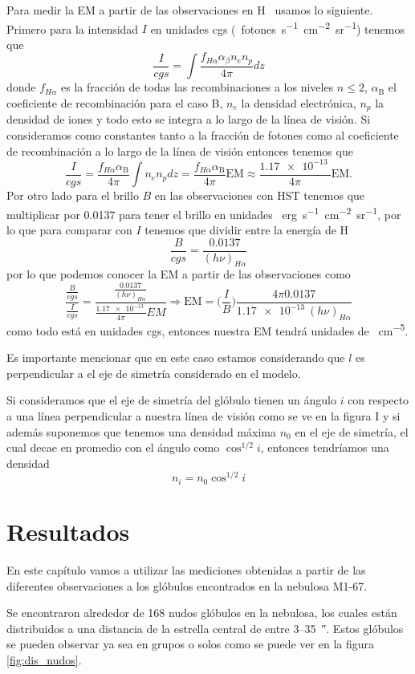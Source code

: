 \documentclass{book}
\begin{document}
Para medir la EM a partir de las observaciones en \unit{H\alpha} usamos lo siguiente. Primero para la intensidad $I$ en unidades cgs (\SI{}{fotones.s^{-1}.cm^{-2}.sr^{-1}}) tenemos que
\[\frac{I}{cgs}=\int \frac{f_{H\alpha}\alpha_\beta n_e n_p}{4\pi}dz\] donde $f_{H\alpha}$ es la fracción de todas las recombinaciones a los niveles $n\le 2$, $\alpha_\mathrm{B}$ el coeficiente de recombinación para el caso B, $n_e$ la densidad electrónica, $n_p$ la densidad de iones y todo esto se integra a lo largo de la línea de visión. Si consideramos como constantes tanto a la fracción de fotones como al coeficiente de recombinación a lo largo de la línea de visión entonces tenemos que
\[\frac{I}{cgs}=\frac{f_{H\alpha}\alpha_\mathrm{B}}{4\pi}\int n_en_pdz=\frac{f_{H\alpha}\alpha_\mathrm{B}}{4\pi} \mathrm{EM} \approx \frac{\SI{1.17e-13}{}}{4\pi}\mathrm{EM}.\]
Por otro lado para el brillo $B$ en las observaciones con  HST tenemos que multiplicar por 0.0137 para tener el brillo en unidades  \SI{}{erg.s^{-1}.cm^{-2}.sr^{-1}}, por lo que para comparar con $I$ tenemos que dividir entre la energía de \unit{H\alpha}
\[\frac{B}{cgs}=\frac{0.0137}{(h\nu)_{\unit{H\alpha}}}\] por lo que podemos conocer la EM a partir de las observaciones como 
\[\frac{\frac{B}{cgs}}{\frac{I}{cgs}}=\frac{\frac{0.0137}{(h\nu)_{\unit{H\alpha}}}}{\frac{\SI{1.17e-13}{}}{4\pi}EM}\Rightarrow \mathrm{EM} = \Big(\frac{I}{B}\Big)\frac{4\pi 0.0137}{\SI{1.17e-13}{}(h\nu)_{\unit{H\alpha}}}\] como todo está en unidades cgs, entonces nuestra EM tendrá unidades de \SI{}{cm^{-5}}.

Es importante mencionar que en este caso estamos considerando que $l$ es perpendicular a el eje de simetría considerado en el modelo. 

Si consideramos que el eje de simetría del glóbulo tienen un ángulo $i$ con respecto a una línea perpendicular a nuestra línea de visión como se ve en la figura I y si además  suponemos que tenemos una densidad máxima $n_0$ en el eje de simetría, el cual decae en promedio con el ángulo como $\cos^{1/2} i$, entonces tendríamos  una densidad \[n_i = n_0\cos^{1/2} i\]

\chapter{Resultados}

En este capítulo vamos a utilizar las mediciones obtenidas a partir de las diferentes observaciones a los glóbulos encontrados en la nebulosa M1-67.

Se encontraron alrededor de 168 nudos glóbulos en la nebulosa, los cuales están distribuidos a una distancia de la estrella central de entre 3--\SI{35}{\arcsecond}.  Estos glóbulos se pueden observar ya sea en grupos o solos como se puede ver en la figura \ref{fig:dis_nudos}. 
\end{document}

